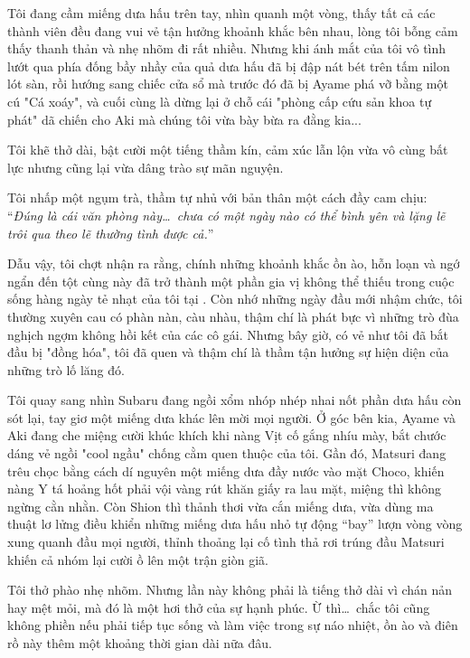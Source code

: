 \documentclass[../main.tex]{subfiles}
\begin{document}
Tôi đang cầm miếng dưa hấu trên tay, nhìn quanh một vòng, thấy tất cả các thành viên đều đang vui vẻ tận hưởng khoảnh khắc bên nhau, lòng tôi bỗng cảm thấy thanh thản và nhẹ nhõm đi rất nhiều. Nhưng khi ánh mắt của tôi vô tình lướt qua phía đống bầy nhầy của quả dưa hấu đã bị đập nát bét trên tấm nilon lót sàn, rồi hướng sang chiếc cửa sổ mà trước đó đã bị Ayame phá vỡ bằng một cú "Cá xoáy", và cuối cùng là dừng lại ở chỗ cái "phòng cấp cứu sản khoa tự phát" dã chiến cho Aki mà chúng tôi vừa bày bừa ra đằng kia...

Tôi khẽ thở dài, bật cười một tiếng thầm kín, cảm xúc lẫn lộn vừa vô cùng bất lực nhưng cũng lại vừa dâng trào sự mãn nguyện.

Tôi nhấp một ngụm trà, thầm tự nhủ với bản thân một cách đầy cam chịu:
``\textit{Đúng là cái văn phòng này\dots\ chưa có một ngày nào có thể bình yên và lặng lẽ trôi qua theo lẽ thường tình được cả.}''

Dẫu vậy, tôi chợt nhận ra rằng, chính những khoảnh khắc ồn ào, hỗn loạn và ngớ ngẩn đến tột cùng này đã trở thành một phần gia vị không thể thiếu trong cuộc sống hàng ngày tẻ nhạt của tôi tại \hll. Còn nhớ những ngày đầu mới nhậm chức, tôi thường xuyên cau có phàn nàn, càu nhàu, thậm chí là phát bực vì những trò đùa nghịch ngợm không hồi kết của các cô gái. Nhưng bây giờ, có vẻ như tôi đã bắt đầu bị "đồng hóa", tôi đã quen và thậm chí là thầm tận hưởng sự hiện diện của những trò lố lăng đó.

Tôi quay sang nhìn Subaru đang ngồi xổm nhóp nhép nhai nốt phần dưa hấu còn sót lại, tay giơ một miếng dưa khác lên mời mọi người. Ở góc bên kia, Ayame và Aki đang che miệng cười khúc khích khi nàng Vịt cố gắng nhíu mày, bắt chước dáng vẻ ngồi "cool ngầu" chống cằm quen thuộc của tôi. Gần đó, Matsuri đang trêu chọc bằng cách dí nguyên một miếng dưa đầy nước vào mặt Choco, khiến nàng Y tá hoảng hốt phải vội vàng rút khăn giấy ra lau mặt, miệng thì không ngừng cằn nhằn. Còn Shion thì thảnh thơi vừa cắn miếng dưa, vừa dùng ma thuật lơ lửng điều khiển những miếng dưa hấu nhỏ tự động ``bay'' lượn vòng vòng xung quanh đầu mọi người, thỉnh thoảng lại cố tình thả rơi trúng đầu Matsuri khiến cả nhóm lại cười ồ lên một trận giòn giã.

Tôi thở phào nhẹ nhõm. Nhưng lần này không phải là tiếng thở dài vì chán nản hay mệt mỏi, mà đó là một hơi thở của sự hạnh phúc. Ừ thì\dots\ chắc tôi cũng không phiền nếu phải tiếp tục sống và làm việc trong sự náo nhiệt, ồn ào và điên rồ này thêm một khoảng thời gian dài nữa đâu.
\end{document}
